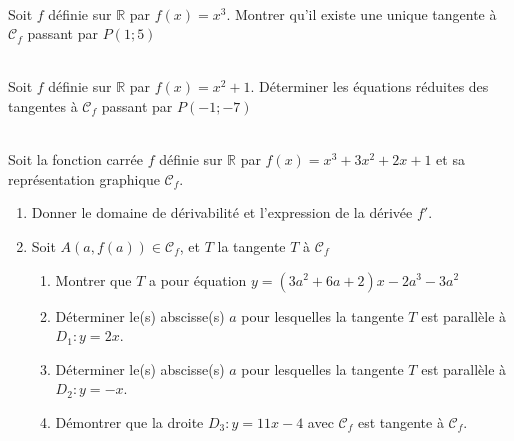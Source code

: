 \documentclass[main.tex]{subfiles}
\begin{document}
\begin{exercise}\label{chapter04:exercice:tangente07}\hfill \\
Soit $f$ définie sur $\mathbb{R}$ par $f(x)=x^3$. Montrer qu'il existe une unique tangente à $\mathscr{C}_f$ passant par $P(1;5)$ 
\end{exercise}
\begin{exercise}\label{chapter04:exercice:tangente08} \hfill \\
Soit $f$ définie sur $\mathbb{R}$ par $f(x)=x^2+1$.  Déterminer les équations réduites des tangentes à $\mathscr{C}_f$ passant par $P(-1;-7)$ 
\end{exercise} 
\begin{exercise}\label{chapter04:exercice:determinerfonction06} \hfill  \\
	Soit la fonction carrée $f$ définie sur $\mathbb{R}$ par   $f(x)=x^3+3x^2+2x+1$ et sa représentation graphique $\mathscr{C}_f$. 
	\begin{enumerate}[label={\arabic*)}, leftmargin=*] 
		\item Donner le domaine de dérivabilité et  l'expression de la dérivée $f'$. 
		\item Soit $A(a,f(a))\in\mathscr{C}_f$, et $T$ la tangente $T$ à $\mathscr{C}_f$
		\begin{enumerate}[leftmargin=*]
			\item Montrer que $T$ a pour équation $y= (3a^2+6a+2)x -2a^3-3a^2$
			\item Déterminer le(s) abscisse(s) $a$ pour lesquelles la tangente $T$ est parallèle à $D_1\colon y=2x$.
			\item Déterminer le(s) abscisse(s) $a$ pour lesquelles la tangente $T$ est parallèle à $D_2\colon y=-x$.
			\item Démontrer que la droite $D_3\colon y=11x-4$ avec $\mathscr{C}_f$   est tangente à $\mathscr{C}_f$.
		\end{enumerate}
	\end{enumerate}  
\end{exercise}   



%	 
\newpage 
{}  
\pagestyle{scrheadings} %
\onehalfspacing
\end{document}
